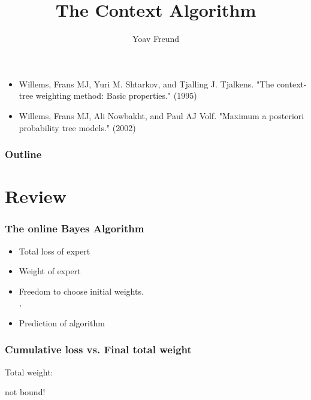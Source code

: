 \documentclass{beamer}
\title{The Context Algorithm}
\author[Freund] %
{Yoav Freund}
\institute[Universities of Somewhere and Elsewhere] %
\begin{document}

\begin{frame}
  \titlepage
\begin{itemize}
\item  Willems, Frans MJ, Yuri M. Shtarkov, and Tjalling J. Tjalkens. "The context-tree weighting method: Basic properties." (1995)  \\
\item  Willems, Frans MJ, Ali Nowbakht, and Paul AJ Volf. "Maximum a posteriori probability tree models." (2002)
\end{itemize}
\end{frame}

\begin{frame}
  \frametitle{Outline}
  \tableofcontents[pausesections]
\end{frame}

\section{Review}

\begin{frame}
\frametitle{The online Bayes Algorithm}
\begin{itemize}
\item {\color{blue} Total loss} of expert 
\item {\color{blue}Weight} of expert 
\item
Freedom to choose initial weights.\\
 , 
\item {\color{blue}Prediction} of algorithm 
\R{\[
\vp_A^t = \frac{\sum_{i=1}^N \wt{t}{i} \vp_i^t}{\sum_{i=1}^N \wt{t}{i}}
\]}
\end{itemize}
\end{frame}

\begin{frame}
\frametitle{Cumulative loss vs. Final total weight}

 Total weight: 

 
 
\R{\[
\onslide<8-> -\log W^{T+1} =
\onslide<6-> -\log \frac{W^{T+1}}{W^1} = -\sum_{t=1}^T \log p_A^t(c^t)
\onslide<7-> = L_A^T
\]}
  not bound!
\end{frame}
\end{document}
